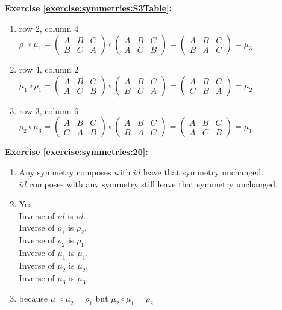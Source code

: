 \noindent\textbf{Exercise \ref{exercise:symmetries:S3Table}:}
\begin{enumerate}[{a.}]
\item
row 2, column 4\\
$\rho_1 \circ \mu_1 = \begin{pmatrix}
A & B & C\\
B & C & A
\end{pmatrix} \circ \begin{pmatrix}
A & B & C\\
A & C & B
\end{pmatrix}=\begin{pmatrix}
A & B & C\\
B & A & C
\end{pmatrix}=\mu_3$
\item
row 4, column 2\\
$\mu_1\circ \rho_1=\begin{pmatrix}
A & B & C\\
A & C & B
\end{pmatrix}\circ \begin{pmatrix}
A & B & C\\
B & C & A
\end{pmatrix}=\begin{pmatrix}
A & B & C\\
C & B & A
\end{pmatrix}=\mu_2$
\item
row 3, column 6\\
$\rho_2\circ \mu_3=\begin{pmatrix}
A & B & C\\
C & A & B
\end{pmatrix}\circ \begin{pmatrix}
A & B & C\\
B & A & C
\end{pmatrix}=\begin{pmatrix}
A & B & C\\
A & C & B
\end{pmatrix}=\mu_1$
\end{enumerate}

\noindent\textbf{Exercise \ref{exercise:symmetries:20}:}
\begin{enumerate}[{a.}]
\item
Any symmetry composes with $id$ leave that symmetry unchanged.\\
$id$ composes with any symmetry still leave that symmetry unchanged.
\item
Yes.\\
Inverse of $id$ is $id$.\\
Inverse of $\rho_1$ is $\rho_2$.\\
Inverse of $\rho_2$ is $\rho_1$.\\
Inverse of $\mu_1$ is $\mu_1$.\\
Inverse of $\mu_2$ is $\mu_2$.\\
Inverse of $\mu_3$ is $\mu_3$.
\item
because $\mu_1\circ \mu_2 = \rho_1$ but $\mu_2\circ \mu_1=\rho_2$
\end{enumerate}

